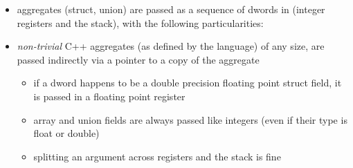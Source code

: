 \begin{itemize}
\item aggregates (struct, union) are passed as a sequence of dwords in (integer registers and the stack), with the following particularities:
\item {\it non-trivial} C++ aggregates (as defined by the language) of any size, are passed indirectly via a pointer to a copy of the aggregate
\begin{itemize}
\item if a dword happens to be a double precision floating point struct field, it is passed in a floating point register
\item array and union fields are always passed like integers (even if their type is float or double)
\item splitting an argument across registers and the stack is fine
\end{itemize}
\end{itemize}


